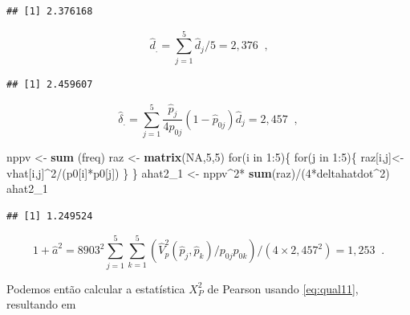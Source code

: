 \documentclass[]{book}
\newenvironment{Shaded}{\begin{snugshade}}{\end{snugshade}}
\newcommand{\KeywordTok}[1]{\textcolor[rgb]{0.13,0.29,0.53}{\textbf{{#1}}}}
\newcommand{\DecValTok}[1]{\textcolor[rgb]{0.00,0.00,0.81}{{#1}}}
\newcommand{\StringTok}[1]{\textcolor[rgb]{0.31,0.60,0.02}{{#1}}}
\newcommand{\OtherTok}[1]{\textcolor[rgb]{0.56,0.35,0.01}{{#1}}}
\newcommand{\NormalTok}[1]{{#1}}
\numberwithin{example}{chapter}
\numberwithin{remark}{chapter}
\numberwithin{definition}{chapter}
\begin{document}
\begin{verbatim}
## [1] 2.376168
\end{verbatim}

\[
\hat{d}_{.}=\sum_{j=1}^{5}\hat{d}_{j}/5=2,376\;\;\mbox{,} 
\]

\begin{Shaded}
\end{Shaded}

\begin{verbatim}
## [1] 2.459607
\end{verbatim}

\[
\hat{\delta}_{.}=\sum_{j=1}^5\frac{\hat{p}_{j}}{4p_{0j}}
\left( 1-\hat{p}_{0j}\right) \hat{d}_{j}=2,457\;\;, 
\]

\begin{Shaded}
\begin{Highlighting}[]
\NormalTok{nppv <-}\StringTok{ }\KeywordTok{sum} \NormalTok{(freq)}
\NormalTok{raz <-}\StringTok{ }\KeywordTok{matrix}\NormalTok{(}\OtherTok{NA}\NormalTok{,}\DecValTok{5}\NormalTok{,}\DecValTok{5}\NormalTok{)}
\NormalTok{for(i in }\DecValTok{1}\NormalTok{:}\DecValTok{5}\NormalTok{)\{}
  \NormalTok{for(j in }\DecValTok{1}\NormalTok{:}\DecValTok{5}\NormalTok{)\{}
    \NormalTok{raz[i,j]<-}\StringTok{ }\NormalTok{vhat[i,j]^}\DecValTok{2}\NormalTok{/(p0[i]*p0[j])}
  \NormalTok{\}}
\NormalTok{\}}
\NormalTok{ahat2_1 <-}\StringTok{ }\NormalTok{nppv^}\DecValTok{2}\NormalTok{*}\StringTok{ }\KeywordTok{sum}\NormalTok{(raz)/(}\DecValTok{4}\NormalTok{*deltahatdot^}\DecValTok{2}\NormalTok{)}
\NormalTok{ahat2_1}
\end{Highlighting}
\end{Shaded}

\begin{verbatim}
## [1] 1.249524
\end{verbatim}

\[
1+\hat{a}^{2}=8903^{2}\sum\limits_{j=1}^{5}\sum\limits_{k=1}^{5}\left( \hat{V}_{p}^{2}\left( \hat{p}_{j},\hat{p}_{k}\right) /p_{0j}p_{0k}\right) /\left(
4\times 2,457^{2}\right) =1,253\;\;. 
\]

Podemos então calcular a estatística \(X_{P}^{2}\) de Pearson usando
\eqref{eq:qual11}, resultando em
\end{document}

